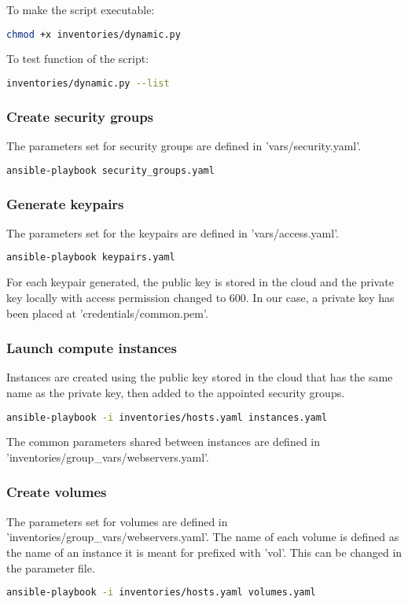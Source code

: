 To make the script executable:  
\begin{lstlisting}[language=bash]
chmod +x inventories/dynamic.py
\end{lstlisting}

To test function of the script:  
\begin{lstlisting}[language=bash]
inventories/dynamic.py --list
\end{lstlisting}

\subsubsection{Create security groups}
The parameters set for security groups are defined in 'vars/security.yaml'.  
\begin{lstlisting}[language=bash]
ansible-playbook security_groups.yaml
\end{lstlisting}

\subsubsection{Generate keypairs}
The parameters set for the keypairs are defined in 'vars/access.yaml'.  
\begin{lstlisting}[language=bash]
ansible-playbook keypairs.yaml
\end{lstlisting}
For each keypair generated, the public key is stored in the cloud and the private key locally with access permission changed to 600. In our case, a private key has been placed at 'credentials/common.pem'.  

\subsubsection{Launch compute instances}
Instances are created using the public key stored in the cloud that has the same name as the private key, then added to the appointed security groups.  
\begin{lstlisting}[language=bash]
ansible-playbook -i inventories/hosts.yaml instances.yaml
\end{lstlisting}

The common parameters shared between instances are defined in 'inventories/group\_vars/webservers.yaml'.  

\subsubsection{Create volumes}
The parameters set for volumes are defined in 'inventories/group\_vars/webservers.yaml'. The name of each volume is defined as the name of an instance it is meant for prefixed with 'vol'. This can be changed in the parameter file.  
\begin{lstlisting}[language=bash]
ansible-playbook -i inventories/hosts.yaml volumes.yaml
\end{lstlisting}

